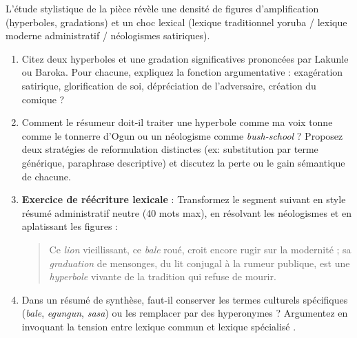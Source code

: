 \documentclass[11pt]{article}
\begin{document}
\begin{exercice}
L'étude stylistique de la pièce révèle une densité de figures d'amplification (hyperboles, gradations) et un choc lexical (lexique traditionnel yoruba / lexique moderne administratif / néologismes satiriques).

\begin{enumerate}
    \item Citez deux hyperboles et une gradation significatives prononcées par Lakunle ou Baroka. Pour chacune, expliquez la fonction argumentative : exagération satirique, glorification de soi, dépréciation de l'adversaire, création du comique ?
    \item Comment le résumeur doit-il traiter une hyperbole comme \og ma voix tonne comme le tonnerre d'Ogun \fg{} ou un néologisme comme \og \textit{bush-school} \fg{} ? Proposez deux stratégies de reformulation distinctes (ex: substitution par terme générique, paraphrase descriptive) et discutez la perte ou le gain sémantique de chacune.
    \item \textbf{Exercice de réécriture lexicale} : Transformez le segment suivant en style résumé administratif neutre (40 mots max), en résolvant les néologismes et en aplatissant les figures :
    \begin{quote}
    \og Ce \textit{lion} vieillissant, ce \textit{bale} roué, croit encore rugir sur la modernité ; sa \textit{graduation} de mensonges, du lit conjugal à la rumeur publique, est une \textit{hyperbole} vivante de la tradition qui refuse de mourir. \fg{}
    \end{quote}
    \item Dans un résumé de synthèse, faut-il conserver les termes culturels spécifiques (\textit{bale}, \textit{egungun}, \textit{sasa}) ou les remplacer par des hyperonymes ? Argumentez en invoquant la tension entre \og lexique commun \fg{} et \og lexique spécialisé \fg{}.
\end{enumerate}
\end{exercice}
\end{document}
